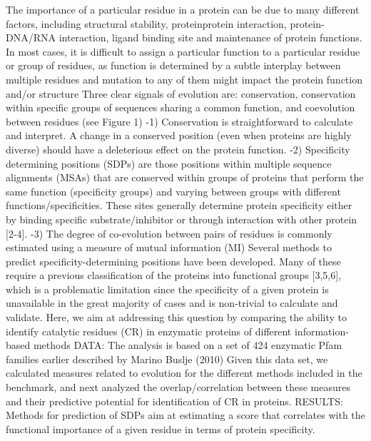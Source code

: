 The importance of a particular residue in a protein can be due to many different factors, including structural stability, proteinprotein interaction, protein-DNA/RNA interaction, ligand binding site and maintenance of protein functions. \cite{teppa2012disentangling}
In most cases, it is difficult to assign a particular function to a particular residue or group of residues, as function is determined by a subtle interplay between multiple residues and mutation to any of them might impact the protein function and/or structure \cite{teppa2012disentangling}
Three clear signals of evolution are: conservation, conservation within specific groups of sequences sharing a common function, and coevolution between residues (see Figure 1) \cite{teppa2012disentangling}
	-1) Conservation is straightforward to calculate and interpret. A change in a conserved position (even when proteins are highly diverse) should have a deleterious effect on the protein function. \cite{teppa2012disentangling}
	-2) Specificity determining positions (SDPs) are those positions within multiple sequence alignments (MSAs) that are conserved within groups of proteins that perform the same function (specificity groups) and varying between groups with different functions/specificities. These sites generally determine protein specificity either by binding specific substrate/inhibitor or through interaction with other protein [2-4]. \cite{teppa2012disentangling}
	-3) The degree of co-evolution between pairs of residues is commonly estimated using a measure of mutual information (MI) \cite{teppa2012disentangling}
Several methods to predict specificity-determining positions have been developed. Many of these require a previous classification of the proteins into functional groups [3,5,6], which is a problematic limitation since the specificity of a given protein is unavailable in the great majority of cases and is non-trivial to calculate and validate. \cite{teppa2012disentangling}
Here, we aim at addressing this question by comparing the ability to identify catalytic residues (CR) in enzymatic proteins of different information-based methods \cite{teppa2012disentangling}
DATA: The analysis is based on a set of 424 enzymatic Pfam families earlier described by Marino Buslje (2010)  \cite{teppa2012disentangling}
Given this data set, we calculated measures related to evolution for the different methods included in the benchmark, and next analyzed the overlap/correlation between these measures and their predictive potential for identification of CR in proteins. \cite{teppa2012disentangling}
RESULTS:
	Methods for prediction of SDPs aim at estimating a score that correlates with the functional importance of a given residue in terms of protein specificity. \cite{teppa2012disentangling}
